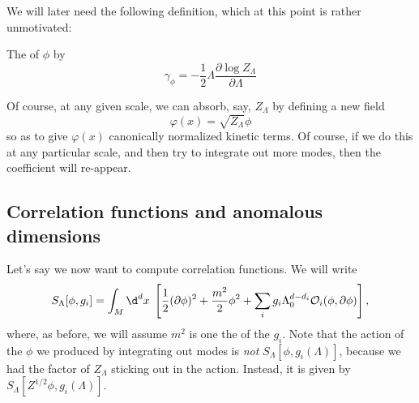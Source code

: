 \documentclass[a4paper]{article}
\begin{document}
We will later need the following definition, which at this point is rather unmotivated:
\begin{defi}
  The  of $\phi$ by
  \[
    \gamma_\phi = - \frac{1}{2} \Lambda \frac{\partial \log Z_\Lambda}{\partial \Lambda}
  \]
\end{defi}

Of course, at any given scale, we can absorb, say, $Z_\Lambda$ by defining a new field
\[
  \varphi(x) = \sqrt{Z_\Lambda} \phi
\]
so as to give $\varphi(x)$ canonically normalized kinetic terms. Of course, if we do this at any particular scale, and then try to integrate out more modes, then the coefficient will re-appear.

\subsection{Correlation functions and anomalous dimensions}
Let's say we now want to compute correlation functions. We will write
\[
  S_\Lambda[\phi, g_i] = \int_M \d^d x\; \left[\frac{1}{2}(\partial \phi)^2 + \frac{m^2}{2} \phi^2 + \sum_i g_i \Lambda^{d - d_i}_0 \mathcal{O}_i(\phi , \partial\phi)\right],
\]
where, as before, we will assume $m^2$ is one the of the $g_i$. Note that the action of the $\phi$ we produced by integrating out modes is \emph{not} $S_\Lambda[\phi, g_i(\Lambda)]$, because we had the factor of $Z_\Lambda$ sticking out in the action. Instead, it is given by $S_\Lambda[Z^{1/2} \phi, g_i(\Lambda)]$.
\end{document}

